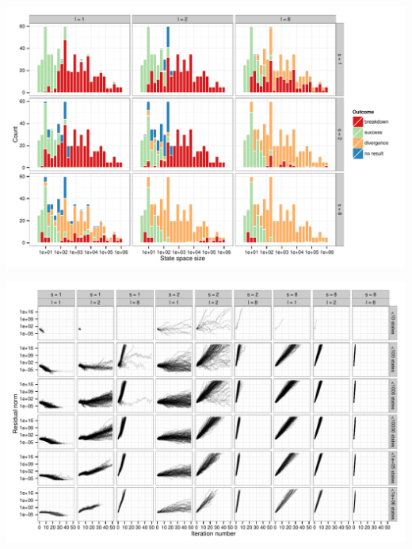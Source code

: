 \begin{figurepage}
  \includegraphics{figures/idrstab_histograms}
  \label{fig:evaluation:idrstab:histogram}
\end{figurepage}

\begin{figurepage}
  \includegraphics{figures/idrstab_convergence}
  \label{fig:evaluation:idrstab:traj}
\end{figurepage}
